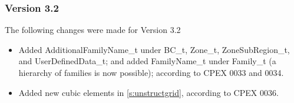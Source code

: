 \subsubsection{Version 3.2}
The following changes were made for Version 3.2

\begin{itemize}
\item Added AdditionalFamilyName\_t under BC\_t, Zone\_t, ZoneSubRegion\_t, and
      UserDefinedData\_t; and added
      FamilyName\_t under Family\_t (a hierarchy of families is now possible); according
      to CPEX 0033 and 0034.
\item Added new cubic elements in \autoref{s:unstructgrid}, according to CPEX 0036.
\end{itemize}
